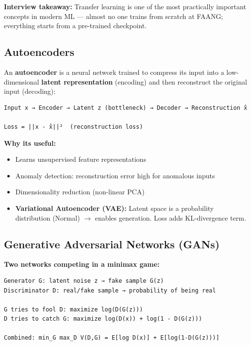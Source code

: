 \documentclass[11pt]{article}
\providecommand{\tightlist}{\setlength{\itemsep}{1pt}\setlength{\parskip}{0pt}}
\begin{document}
\textbf{Interview takeaway:} Transfer learning is one of the most practically important concepts in modern ML --- almost no one trains from scratch at FAANG; everything starts from a pre-trained checkpoint.

\subsection{Autoencoders}\label{autoencoders}

An \textbf{autoencoder} is a neural network trained to compress its input into a low-dimensional \textbf{latent representation} (encoding) and then reconstruct the original input (decoding):

\setcodelang{}

\begin{verbatim}
Input x → Encoder → Latent z (bottleneck) → Decoder → Reconstruction x̂

Loss = ||x - x̂||²  (reconstruction loss)
\end{verbatim}

\textbf{Why it\textquotesingle s useful:}

\begin{itemize}
\tightlist
\item
  Learns unsupervised feature representations
\item
  Anomaly detection: reconstruction error high for anomalous inputs
\item
  Dimensionality reduction (non-linear PCA)
\item
  \textbf{Variational Autoencoder (VAE):} Latent space is a probability distribution (Normal) \(\rightarrow\) enables generation. Loss adds KL-divergence term.
\end{itemize}

\subsection{Generative Adversarial Networks (GANs)}\label{generative-adversarial-networks-gans}

\textbf{Two networks competing in a minimax game:}

\setcodelang{}

\begin{verbatim}
Generator G: latent noise z → fake sample G(z)
Discriminator D: real/fake sample → probability of being real

G tries to fool D: maximize log(D(G(z)))
D tries to catch G: maximize log(D(x)) + log(1 - D(G(z)))

Combined: min_G max_D V(D,G) = E[log D(x)] + E[log(1-D(G(z)))]
\end{verbatim}
\end{document}
